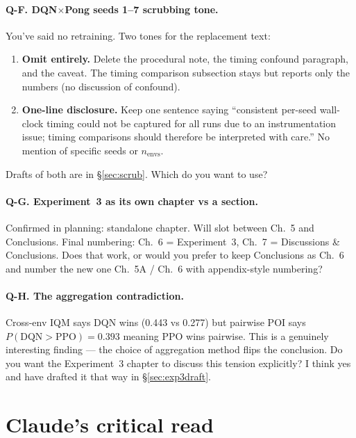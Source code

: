 \documentclass[11pt,a4paper]{article}
\newcommand{\qlabel}[1]{\textbf{\color{blue!50!black} Q-#1.}}
\begin{document}
\paragraph{\qlabel{F} DQN$\times$Pong seeds 1--7 scrubbing tone.}
You've said no retraining. Two tones for the replacement text:
\begin{enumerate}[label=(\alph*),leftmargin=*]
  \item \textbf{Omit entirely.} Delete the procedural note, the timing
  confound paragraph, and the caveat. The timing comparison subsection
  stays but reports only the numbers (no discussion of confound).
  \item \textbf{One-line disclosure.} Keep one sentence saying
  ``consistent per-seed wall-clock timing could not be captured for all
  runs due to an instrumentation issue; timing comparisons should therefore
  be interpreted with care.'' No mention of specific seeds or $n_{\text{envs}}$.
\end{enumerate}
Drafts of both are in \S\ref{sec:scrub}. Which do you want to use?

\paragraph{\qlabel{G} Experiment~3 as its own chapter vs a section.}
Confirmed in planning: standalone chapter. Will slot between Ch.~5 and
Conclusions. Final numbering: Ch.~6 = Experiment~3, Ch.~7 = Discussions
\& Conclusions. Does that work, or would you prefer to keep Conclusions
as Ch.~6 and number the new one Ch.~5A / Ch.~6 with appendix-style
numbering?

\paragraph{\qlabel{H} The aggregation contradiction.}
Cross-env IQM says DQN wins (0.443 vs 0.277) but pairwise POI says
$P(\text{DQN}>\text{PPO}) = 0.393$ meaning PPO wins pairwise. This is a
genuinely interesting finding --- the choice of aggregation method flips
the conclusion. Do you want the Experiment~3 chapter to discuss this
tension explicitly? I think yes and have drafted it that way in
\S\ref{sec:exp3draft}.

\section{Claude's critical read}\label{sec:critique}
\end{document}
